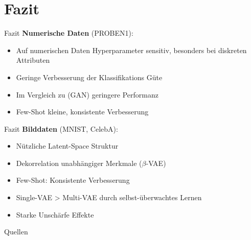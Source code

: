 \documentclass[10pt, compress]{beamer}
\begin{document}
\section{Fazit}
\begin{frame}{Fazit}
  \textbf{Numerische Daten} (PROBEN1):
  \begin{itemize}
    \item Auf numerischen Daten Hyperparameter sensitiv, besonders bei diskreten Attributen
    \item Geringe Verbesserung der Klassifikations Güte
    \item Im Vergleich zu \cite{Moreno-Barea2020} (GAN) geringere Performanz
    \item Few-Shot kleine, konsistente Verbesserung
  \end{itemize}
\end{frame}

\begin{frame}{Fazit}
  \textbf{Bilddaten} (MNIST, CelebA):
  \begin{itemize}
    \item Nützliche Latent-Space Struktur
    \item Dekorrelation unabhängiger Merkmale ($\beta$-VAE)
    \item Few-Shot: Konsistente Verbesserung
    \item Single-VAE > Multi-VAE durch selbst-überwachtes Lernen
    \item Starke Unschärfe Effekte
  \end{itemize}
\end{frame}


\begin{frame}{Quellen}
    \AtNextBibliography{\tiny}
    \printbibliography
\end{frame}

\begingroup
{}
\endgroup
\end{document}
